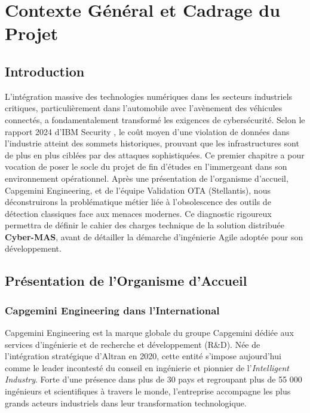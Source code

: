 \documentclass[a4paper, 12pt]{report}
\begin{document}
\chapter{Contexte Général et Cadrage du Projet}
\label{chap:contexte_general}

\section*{Introduction}

L'intégration massive des technologies numériques dans les secteurs industriels critiques, particulièrement dans l'automobile avec l'avènement des véhicules connectés, a fondamentalement transformé les exigences de cybersécurité. Selon le rapport 2024 d'IBM Security \cite{ibm_report}, le coût moyen d'une violation de données dans l'industrie atteint des sommets historiques, prouvant que les infrastructures sont de plus en plus ciblées par des attaques sophistiquées. Ce premier chapitre a pour vocation de poser le socle du projet de fin d'études en l'immergeant dans son environnement opérationnel. Après une présentation de l'organisme d'accueil, Capgemini Engineering, et de l'équipe Validation OTA (Stellantis), nous déconstruirons la problématique métier liée à l'obsolescence des outils de détection classiques face aux menaces modernes. Ce diagnostic rigoureux permettra de définir le cahier des charges technique de la solution distribuée \textbf{Cyber-MAS}, avant de détailler la démarche d'ingénierie Agile adoptée pour son développement.

\section{Présentation de l'Organisme d'Accueil}
\label{sec:presentation_organisme}

\subsection{Capgemini Engineering dans l'International}
Capgemini Engineering est la marque globale du groupe Capgemini dédiée aux services d'ingénierie et de recherche et développement (R\&D). Née de l'intégration stratégique d'Altran en 2020, cette entité s'impose aujourd'hui comme le leader incontesté du conseil en ingénierie et pionnier de l'\textit{Intelligent Industry}. Forte d'une présence dans plus de 30 pays et regroupant plus de 55 000 ingénieurs et scientifiques à travers le monde, l'entreprise accompagne les plus grands acteurs industriels dans leur transformation technologique. 
\end{document}
